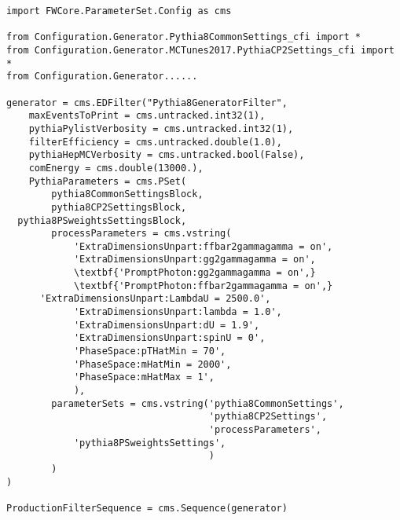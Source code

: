 \begin{singlespace}
\begin{small}
\begin{verbatim}
import FWCore.ParameterSet.Config as cms 

from Configuration.Generator.Pythia8CommonSettings_cfi import *
from Configuration.Generator.MCTunes2017.PythiaCP2Settings_cfi import *
from Configuration.Generator......

generator = cms.EDFilter("Pythia8GeneratorFilter",
    maxEventsToPrint = cms.untracked.int32(1),
    pythiaPylistVerbosity = cms.untracked.int32(1),
    filterEfficiency = cms.untracked.double(1.0),
    pythiaHepMCVerbosity = cms.untracked.bool(False),
    comEnergy = cms.double(13000.),
    PythiaParameters = cms.PSet(
        pythia8CommonSettingsBlock,
        pythia8CP2SettingsBlock,
  pythia8PSweightsSettingsBlock,
        processParameters = cms.vstring(
            'ExtraDimensionsUnpart:ffbar2gammagamma = on',
            'ExtraDimensionsUnpart:gg2gammagamma = on',
            \textbf{'PromptPhoton:gg2gammagamma = on',}
            \textbf{'PromptPhoton:ffbar2gammagamma = on',}
      'ExtraDimensionsUnpart:LambdaU = 2500.0',
            'ExtraDimensionsUnpart:lambda = 1.0',
            'ExtraDimensionsUnpart:dU = 1.9',
            'ExtraDimensionsUnpart:spinU = 0',
            'PhaseSpace:pTHatMin = 70',
            'PhaseSpace:mHatMin = 2000',
            'PhaseSpace:mHatMax = 1',
            ),  
        parameterSets = cms.vstring('pythia8CommonSettings',
                                    'pythia8CP2Settings',
                                    'processParameters',
            'pythia8PSweightsSettings',
                                    )   
        )   
)

ProductionFilterSequence = cms.Sequence(generator)
\end{verbatim}
\end{small}
\end{singlespace}


